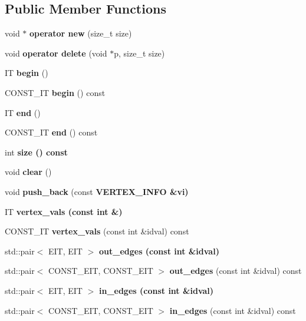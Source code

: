 \subsection*{Public Member Functions}
\begin{CompactItemize}
\item 
void $\ast$ \textbf{operator new} (size\_\-t size)\label{classadj__list_52afb991ff8e5b1aa22f7727682ee07f}

\item 
void \textbf{operator delete} (void $\ast$p, size\_\-t size)\label{classadj__list_595df1df502015a601b126127c0ecd86}

\item 
IT \textbf{begin} ()\label{classadj__list_a9980893a65479d710f2d03e65d307b6}

\item 
CONST\_\-IT \textbf{begin} () const \label{classadj__list_ca6d2990ac7e5ac6baf535165c983e48}

\item 
IT \textbf{end} ()\label{classadj__list_6afb1398071514e17606e488aa4e6507}

\item 
CONST\_\-IT \textbf{end} () const \label{classadj__list_ba7e88f3f15f11fc1b4cd43e3a810090}

\item 
int \bf{size} () const 
\item 
void \textbf{clear} ()\label{classadj__list_a989ee9ff34488da894259dfc0b76a58}

\item 
void \textbf{push\_\-back} (const \bf{VERTEX\_\-INFO} \&vi)\label{classadj__list_9279c0cab973b0dcb3fe34396aaad37c}

\item 
IT \bf{vertex\_\-vals} (const int \&)
\item 
CONST\_\-IT \textbf{vertex\_\-vals} (const int \&idval) const \label{classadj__list_e6d2d2b9f3b6bdc3c835b86d92dd684c}

\item 
std::pair$<$ EIT, EIT $>$ \bf{out\_\-edges} (const int \&idval)
\item 
std::pair$<$ CONST\_\-EIT, CONST\_\-EIT $>$ \textbf{out\_\-edges} (const int \&idval) const \label{classadj__list_2c4b4b8e39060310f76f60bfb6fad4b1}

\item 
std::pair$<$ EIT, EIT $>$ \bf{in\_\-edges} (const int \&idval)
\item 
std::pair$<$ CONST\_\-EIT, CONST\_\-EIT $>$ \textbf{in\_\-edges} (const int \&idval) const \label{classadj__list_6acd5baf404be90ba4c9d6b673372f9c}


\end{CompactItemize}
